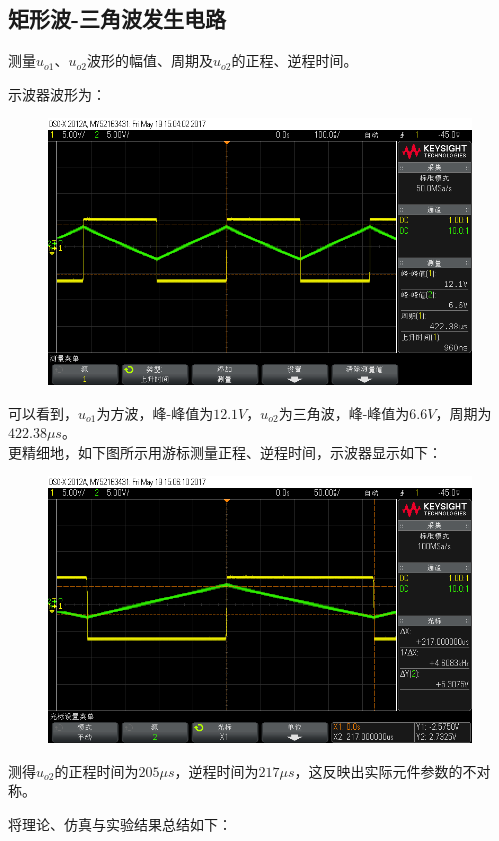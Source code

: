 \documentclass[12pt,a4paper]{article}
\begin{document}
\begin{spacing}{1.3}
\subsection{矩形波-三角波发生电路}
测量$u_{o1}$、$u_{o2}$波形的幅值、周期及$u_{o2}$的正程、逆程时间。\par
示波器波形为：
\begin{figure}[H]
\centering
\includegraphics[width=\textwidth]{scope_4.png}
\end{figure}
可以看到，$u_{o1}$为方波，峰-峰值为$12.1V，u_{o2}$为三角波，峰-峰值为$6.6V$，周期为$422.38\mu s$。\\
更精细地，如下图所示用游标测量正程、逆程时间，示波器显示如下：
\begin{figure}[H]
\centering
\includegraphics[width=\textwidth]{scope_5.png}
\end{figure}
测得$u_{o2}$的正程时间为$205\mu s$，逆程时间为$217\mu s$，这反映出实际元件参数的不对称。\par
将理论、仿真与实验结果总结如下：

\end{spacing}
\end{document}
